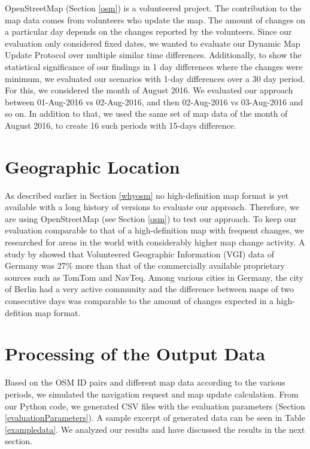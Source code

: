 OpenStreetMap (Section \ref{osm}) is a volunteered project. The contribution to the map data comes from volunteers who update the map. The amount of changes on a particular day depends on the changes reported by the volunteers. Since our evaluation only considered fixed dates, we wanted to evaluate our Dynamic Map Update Protocol over multiple similar time differences. Additionally, to show the statistical significance of our findings in 1 day differences where the changes were minimum, we evaluated our scenarios with 1-day differences over a 30 day period. For this, we considered the month of August 2016. We evaluated our approach between 01-Aug-2016 vs 02-Aug-2016, and then 02-Aug-2016 vs 03-Aug-2016 and so on. In addition to that, we used the same set of map data of the month of August 2016, to create 16 such periods with 15-days difference. 
\section{Geographic Location}
As described earlier in Section \ref{whyosm} no high-definition map format is yet available with a long history of versions to evaluate our approach. Therefore, we are using OpenStreetMap (see Section \ref{osm}) to test our approach. To keep our evaluation comparable to that of a high-definition map with frequent changes, we researched for areas in the world with considerably higher map change activity. A study by \citet{neis2011street} showed that Volunteered Geographic Information (VGI) data of Germany was 27\% more than that of the commercially available proprietary sources such as TomTom and NavTeq. Among various cities in Germany, the city of Berlin had a very active community and the difference between maps of two consecutive days was comparable to the amount of changes expected in a high-defition map format. \\

\section{Processing of the Output Data}
Based on the OSM ID pairs and different map data according to the various periods, we simulated the navigation request and map update calculation. From our Python code, we generated CSV files with the evaluation parameters (Section \ref{evaluationParameters}). A sample excerpt of generated data can be seen in Table \ref{exampledata}. We analyzed our results and have discussed the results in the next section.  

